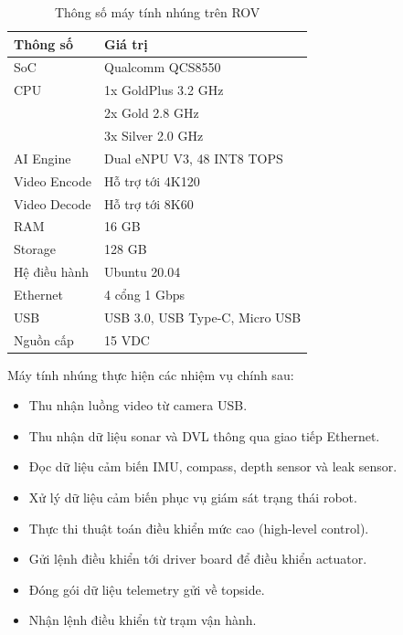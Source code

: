\documentclass[../DoAn.tex]{subfiles}
\begin{document}
\begin{table}[H]
\centering
\caption{Thông số máy tính nhúng trên ROV}
\label{tab:qcs8550_specification}
\begin{tabular}{|p{5cm}|p{7cm}|}
\hline
\textbf{Thông số} & \textbf{Giá trị} \\ \hline

SoC & Qualcomm QCS8550 \\ \hline

CPU & 1x GoldPlus 3.2 GHz \\ 
& 2x Gold 2.8 GHz \\
& 3x Silver 2.0 GHz \\ \hline

AI Engine & Dual eNPU V3, 48 INT8 TOPS \\ \hline

Video Encode & Hỗ trợ tới 4K120 \\ \hline

Video Decode & Hỗ trợ tới 8K60 \\ \hline

RAM & 16 GB \\ \hline

Storage & 128 GB \\ \hline

Hệ điều hành & Ubuntu 20.04 \\ \hline

Ethernet & 4 cổng 1 Gbps \\ \hline

USB & USB 3.0, USB Type-C, Micro USB \\ \hline

Nguồn cấp & 15 VDC \\ \hline

\end{tabular}
\end{table}

Máy tính nhúng thực hiện các nhiệm vụ chính sau:

\begin{itemize}
    \item Thu nhận luồng video từ camera USB.
    \item Thu nhận dữ liệu sonar và DVL thông qua giao tiếp Ethernet.
    \item Đọc dữ liệu cảm biến IMU, compass, depth sensor và leak sensor.
    \item Xử lý dữ liệu cảm biến phục vụ giám sát trạng thái robot.
    \item Thực thi thuật toán điều khiển mức cao (high-level control).
    \item Gửi lệnh điều khiển tới driver board để điều khiển actuator.
    \item Đóng gói dữ liệu telemetry gửi về topside.
    \item Nhận lệnh điều khiển từ trạm vận hành.
\end{itemize}
\end{document}
